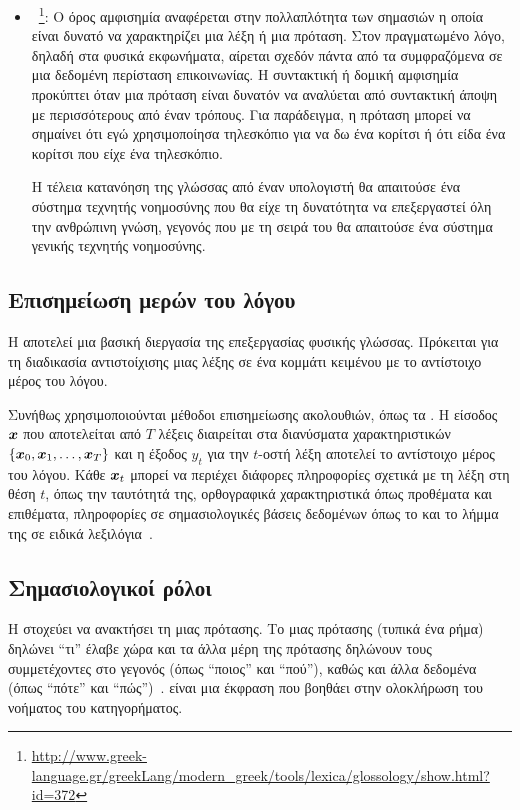 \begin{itemize}
    \item {}~\cite{lexica-glossology}\footnote{\url{http://www.greek-language.gr/greekLang/modern_greek/tools/lexica/glossology/show.html?id=372}}:
          Ο όρος αμφισημία αναφέρεται στην πολλαπλότητα των σημασιών η οποία είναι δυνατό να χαρακτηρίζει μια λέξη ή μια πρόταση.
          Στον πραγματωμένο λόγο, δηλαδή στα φυσικά εκφωνήματα, αίρεται σχεδόν πάντα από τα συμφραζόμενα σε μια δεδομένη περίσταση επικοινωνίας.
          Η συντακτική ή δομική αμφισημία προκύπτει όταν μια πρόταση είναι δυνατόν να αναλύεται από συντακτική άποψη με περισσότερους από έναν τρόπους.
          Για παράδειγμα, η πρόταση  μπορεί να σημαίνει
          ότι εγώ χρησιμοποίησα τηλεσκόπιο για να δω ένα κορίτσι ή ότι είδα ένα κορίτσι που είχε ένα τηλεσκόπιο.

          Η τέλεια κατανόηση της γλώσσας από έναν υπολογιστή θα απαιτούσε ένα σύστημα τεχνητής νοημοσύνης που θα είχε τη δυνατότητα να επεξεργαστεί όλη την ανθρώπινη γνώση,
          γεγονός που με τη σειρά του θα απαιτούσε ένα σύστημα γενικής τεχνητής νοημοσύνης.
\end{itemize}

\subsection{Επισημείωση μερών του λόγου}
Η  αποτελεί μια βασική διεργασία της επεξεργασίας φυσικής γλώσσας.
Πρόκειται για τη διαδικασία αντιστοίχισης μιας λέξης σε ένα κομμάτι κειμένου με το αντίστοιχο μέρος του λόγου.

Συνήθως χρησιμοποιούνται μέθοδοι επισημείωσης ακολουθιών, όπως τα \CRFR{}.
Η είσοδος $\vx$ που αποτελείται από $T$ λέξεις διαιρείται στα διανύσματα χαρακτηριστικών $\{\vx_0,\allowbreak \vx_1,\allowbreak \ldots,\allowbreak \vx_T\}$
και η έξοδος $y_t$ για την $t$-οστή λέξη αποτελεί το αντίστοιχο μέρος του λόγου.
Κάθε $\vx_t$ μπορεί να περιέχει διάφορες πληροφορίες σχετικά με τη λέξη στη θέση $t$,
όπως την ταυτότητά της, ορθογραφικά χαρακτηριστικά όπως προθέματα και επιθέματα, πληροφορίες σε σημασιολογικές βάσεις δεδομένων όπως το  και το λήμμα της σε ειδικά λεξιλόγια~\cite{sutton2012introduction}.

\subsection{Σημασιολογικοί ρόλοι}\label{subsec:srl}
Η  στοχεύει να ανακτήσει τη  μιας πρότασης.
Το  μιας πρότασης (τυπικά ένα ρήμα) δηλώνει \enquote{τι} έλαβε χώρα και τα άλλα μέρη της πρότασης δηλώνουν τους συμμετέχοντες στο γεγονός (όπως \enquote{ποιος} και \enquote{πού}),
καθώς και άλλα δεδομένα (όπως \enquote{πότε} και \enquote{πώς})~\cite{marquez2008semantic}.
 είναι μια έκφραση που βοηθάει στην ολοκλήρωση του νοήματος του κατηγορήματος.

